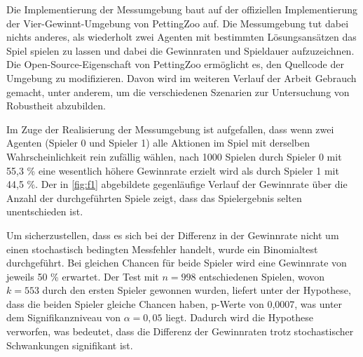 Die Implementierung der Messumgebung baut auf der offiziellen Implementierung der Vier-Gewinnt-Umgebung von PettingZoo auf. Die Messumgebung tut dabei nichts anderes, als wiederholt zwei Agenten mit bestimmten Lösungsansätzen das Spiel spielen zu lassen und dabei die Gewinnraten und Spieldauer aufzuzeichnen. Die Open-Source-Eigenschaft von PettingZoo ermöglicht es, den Quellcode der Umgebung zu modifizieren. Davon wird im weiteren Verlauf der Arbeit Gebrauch gemacht, unter anderem, um die verschiedenen Szenarien zur Untersuchung von Robustheit abzubilden.

Im Zuge der Realisierung der Messumgebung ist aufgefallen, dass wenn zwei Agenten (Spieler 0 und Spieler 1) alle Aktionen im Spiel mit derselben Wahrscheinlichkeit rein zufällig wählen, nach 1000 Spielen durch Spieler 0 mit 55,3 \% eine wesentlich höhere Gewinnrate erzielt wird als durch Spieler 1 mit 44,5 \%. Der in \ref{fig:f1} abgebildete gegenläufige Verlauf der Gewinnrate über die Anzahl der durchgeführten Spiele zeigt, dass das Spielergebnis selten unentschieden ist.

Um sicherzustellen, dass es sich bei der Differenz in der Gewinnrate nicht um einen stochastisch bedingten Messfehler handelt, wurde ein Binomialtest durchgeführt. Bei gleichen Chancen für beide Spieler wird eine Gewinnrate von jeweils 50 \% erwartet. Der Test mit $n = 998$ entschiedenen Spielen, wovon $k = 553$ durch den ersten Spieler gewonnen wurden, liefert unter der Hypothese, dass die beiden Spieler gleiche Chancen haben, p-Werte von 0,0007, was unter dem Signifikanzniveau von $\alpha = 0,05$ liegt. Dadurch wird die Hypothese verworfen, was bedeutet, dass die Differenz der Gewinnraten trotz stochastischer Schwankungen signifikant ist.

